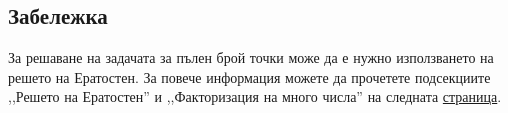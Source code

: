 \documentclass[12pt]{article}
\begin{document}
\subsection{Забележка}
За решаване на задачата за пълен брой точки може да е нужно използването на решето на Ератостен. За повече информация можете да прочетете подсекциите ,,Решето на Ератостен'' и ,,Факторизация на много числа'' на следната \href{https://www.informatika.bg/lectures/primes}{страница}.
\end{document}
